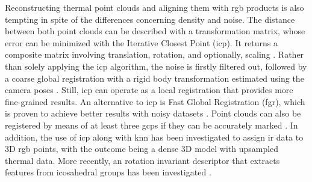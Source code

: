 Reconstructing thermal point clouds and aligning them with \acrshort{rgb} products is also tempting in spite of the differences concerning density and noise. The distance between both point clouds can be described with a transformation matrix, whose error can be minimized with the Iterative Closest Point (\acrshort{icp}). It returns a composite matrix involving translation, rotation, and optionally, scaling \cite{hoegner_mobile_2018, webster_three-dimensional_2018, clarkson_thermal_2017}. Rather than solely applying the \acrshort{icp} algorithm, the noise is firstly filtered out, followed by a coarse global registration with a rigid body transformation estimated using the camera poses \cite{truong_registration_2017}. Still, \acrshort{icp} can operate as a local registration that provides more fine-grained results. An alternative to \acrshort{icp} is Fast Global Registration (\acrshort{fgr}), which is proven to achieve better results with noisy datasets \cite{lin_fusion_2019}. Point clouds can also be registered by means of at least three \acrshort{gcp}s if they can be accurately marked \cite{dahaghin_3d_2019}. In addition, the use of \acrshort{icp} along with \acrshort{knn} has been investigated to assign \acrshort{ir} data to 3D \acrshort{rgb} points, with the outcome being a dense 3D model with upsampled thermal data. More recently, an rotation invariant descriptor that extracts features from icosahedral groups has been investigated \cite{wang_you_2022}.

